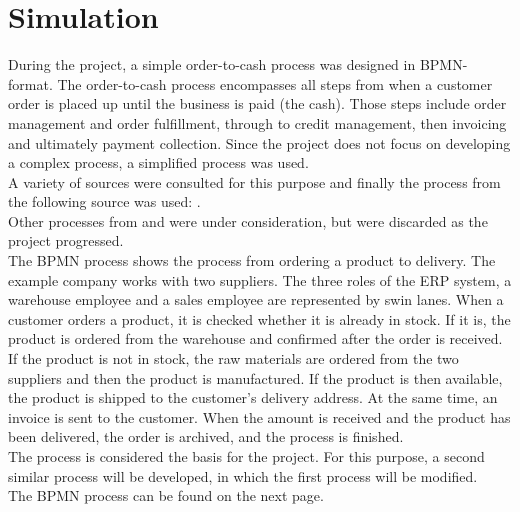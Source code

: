     \section{Simulation}
    During the project, a simple order-to-cash process was designed in BPMN-format. The order-to-cash process encompasses all steps from when a customer order is placed up until the business is paid (the cash). Those steps include order management and order fulfillment, through to credit management, then invoicing and ultimately payment collection. Since the project does not focus on developing a complex process, a simplified process was used.\\
    A variety of sources were consulted for this purpose and finally the process from the following source was used: \cite[][373]{madu2018}.\\
    Other processes from \cite[][251]{dafi2020} and \cite[][353]{duer2017} were under consideration, but were discarded as the project progressed.\\
    The BPMN process shows the process from ordering a product to delivery. The example company works with two suppliers. The three roles of the ERP system, a warehouse employee and a sales employee are represented by swin lanes. When a customer orders a product, it is checked whether it is already in stock. If it is, the product is ordered from the warehouse and confirmed after the order is received. If the product is not in stock, the raw materials are ordered from the two suppliers and then the product is manufactured. If the product is then available, the product is shipped to the customer's delivery address. At the same time, an invoice is sent to the customer. When the amount is received and the product has been delivered, the order is archived, and the process is finished.\\    
    The process is considered the basis for the project. For this purpose, a second similar process will be developed, in which the first process will be modified.\\
    The BPMN process can be found on the next page.
